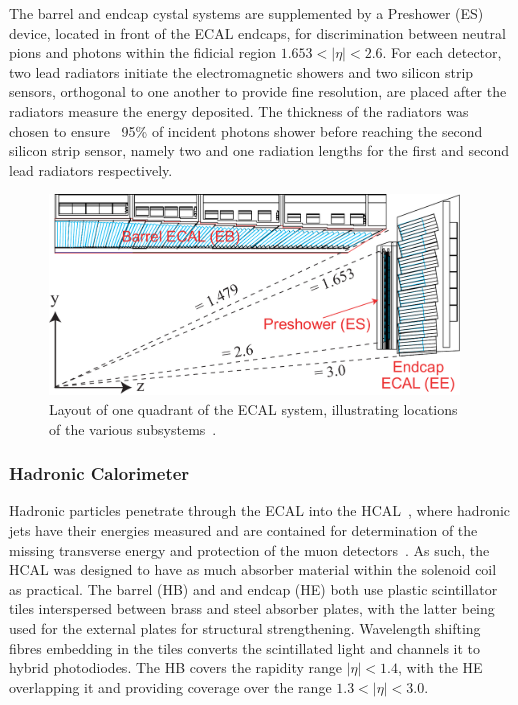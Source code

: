 The barrel and endcap cystal systems are supplemented by a Preshower (ES)~\cite{Loos:539819} device, located in front of the ECAL endcaps, for discrimination between neutral pions and photons within the fidicial region $1.653 < |\eta| < 2.6$.
For each detector, two lead radiators initiate the electromagnetic showers and two silicon strip sensors, orthogonal to one another to provide fine resolution, are placed after the radiators measure the energy deposited.
The thickness of the radiators was chosen to ensure ~95\% of incident photons shower before reaching the second silicon strip sensor, namely two and one radiation lengths for the first and second lead radiators respectively.

\begin{figure}[htbp]
\begin{center}
\includegraphics[width=0.97\textwidth]{figs/cms/ECAL_Transverse_section.pdf}
\caption{Layout of one quadrant of the ECAL system, illustrating locations of the various subsystems~\cite{Bayatian:2006nff}.}
\label{fig:muonChambers}
\end{center}
\end{figure}



\subsubsection{Hadronic Calorimeter}\label{subsubsec:HCAL}
Hadronic particles penetrate through the ECAL into the HCAL~\cite{CMS:1997xji}, where hadronic jets have their energies measured and are contained for determination of the missing transverse energy and protection of the muon detectors~\cite{HCAL:tdr}.
As such, the HCAL was designed to have as much absorber material within the solenoid coil as practical. 
The barrel (HB) and and endcap (HE) both use plastic scintillator tiles interspersed between brass and steel absorber plates, with the latter being used for the external plates for structural strengthening.
Wavelength shifting fibres embedding in the tiles converts the scintillated light and channels it to hybrid photodiodes.
The HB covers the rapidity range $|\eta| < 1.4$, with the HE overlapping it and providing coverage over the range $1.3 < |\eta| < 3.0$.

